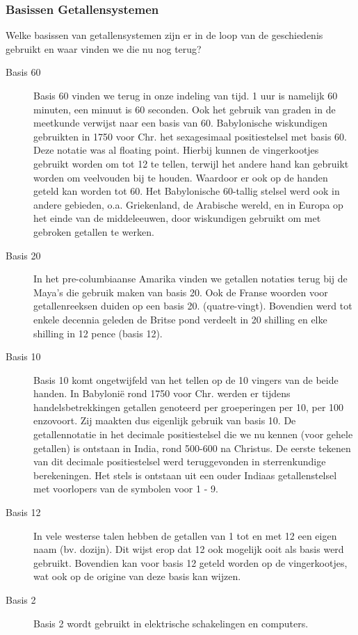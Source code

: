 \documentclass[../main.tex]{subfiles}
\begin{document}
\subsubsection{Basissen Getallensystemen}
\begin{question}
Welke basissen van getallensystemen zijn er in de loop van de geschiedenis gebruikt en waar vinden we die nu nog terug?
\end{question}

\begin{solution}
\begin{description}
		\item[Basis 60] Basis 60 vinden we terug in onze indeling van tijd. 1 uur is namelijk 60 minuten, een minuut is 60 seconden. Ook het gebruik van graden in de meetkunde verwijst naar een basis van 60. Babylonische wiskundigen gebruikten in 1750 voor Chr. het sexagesimaal positiestelsel met basis 60. Deze notatie was al floating point. Hierbij kunnen de vingerkootjes gebruikt worden om tot 12 te tellen, terwijl het andere hand kan gebruikt worden om veelvouden bij te houden. Waardoor er ook op de handen geteld kan worden tot 60.
		Het Babylonische 60-tallig stelsel werd ook in andere gebieden, o.a. Griekenland, de Arabische wereld, en in Europa op het einde van de middeleeuwen, door wiskundigen gebruikt om met gebroken getallen te werken.
		\item[Basis 20] In het pre-columbiaanse Amarika vinden we getallen notaties terug bij de Maya's die gebruik maken van basis 20. Ook de Franse woorden voor getallenreeksen duiden op een basis 20.
		(quatre-vingt). Bovendien werd tot enkele decennia geleden de Britse pond verdeelt in 20 shilling en elke shilling in 12 pence (basis 12).
		\item[Basis 10] Basis 10 komt ongetwijfeld van het tellen op de 10 vingers van de beide handen. In Babyloni\"e rond 1750 voor Chr. werden er tijdens handelsbetrekkingen getallen genoteerd per groeperingen per 10, per 100 enzovoort. Zij maakten dus eigenlijk gebruik van basis 10. De getallennotatie in het decimale positiestelsel die we nu kennen (voor gehele getallen) is ontstaan in India, rond 500-600 na Christus. De eerste tekenen van dit decimale positiestelsel werd teruggevonden in sterrenkundige berekeningen. Het stels is ontstaan uit een ouder Indiaas getallenstelsel met voorlopers van de symbolen voor 1 - 9.
		\item[Basis 12] In vele westerse talen hebben de getallen van 1 tot en met 12 een eigen naam (bv. dozijn). Dit wijst erop dat 12 ook mogelijk ooit als basis werd gebruikt. Bovendien kan voor basis 12 geteld worden op de vingerkootjes, wat ook op de origine van deze basis kan wijzen.
		\item[Basis 2] Basis 2 wordt gebruikt in elektrische schakelingen en computers.
\end{description}
\end{solution}
\end{document}
